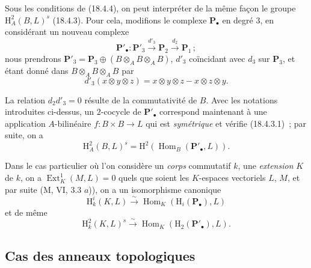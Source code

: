 \begin{env}[18.4.5]
\label{0.18.4.5-fr}
Sous les conditions de (18.4.4), on peut interpréter de la même façon le
groupe $\mathrm H_A^2(B,L)^s$ (18.4.3). Pour cela, modifions le complexe
$\mathbf P_\bullet$ en degré $3$, en considérant un nouveau complexe
\[
  \mathbf P'_\bullet:\mathbf P'_3\xrightarrow{d'_3}\mathbf P_2
  \xrightarrow{d_2}\mathbf P_1\,;
\]
nous prendrons
$\mathbf P'_3=\mathbf P_3\oplus(B\otimes_A B\otimes_A B)$, $d'_3$ coïncidant
avec $d_3$ sur $\mathbf P_3$, et étant donné dans $B\otimes_A B\otimes_A B$
par
\[
  d'_3(x\otimes y\otimes z)=x\otimes y\otimes z-x\otimes z\otimes y.
\]

La relation $d_2d'_3=0$ résulte de la commutativité de $B$. Avec les notations
introduites ci-dessus, un $2$-cocycle de $\mathbf P'_\bullet$ correspond
maintenant à une application $A$-bilinéaire $f:B\times B\to L$ qui est
\emph{symétrique} et vérifie (18.4.3.1)~; par suite, on a
\[
  \mathrm H_A^2(B,L)^s
  =\mathrm H^2(\operatorname{Hom}_B(\mathbf P'_\bullet,L)).
\]
\end{env}

\begin{env}[18.4.6]
\label{0.18.4.6-fr}
Dans le cas particulier où l'on considère un \emph{corps} commutatif $k$, une
\emph{extension} $K$ de $k$, on a $\operatorname{Ext}_K^1(M,L)=0$ quels que
soient les $K$-espaces vectoriels $L$, $M$, et par suite (M, VI, 3.3 $a$)), on
a un isomorphisme canonique
\begin{equation}
\label{0.18.4.6.1-fr}
\tag{18.4.6.1}
  \mathrm H_k^i(K,L)\xrightarrow{\sim}
  \operatorname{Hom}_K(\mathrm H_i(\mathbf P_\bullet),L)
\end{equation}
et de même
\begin{equation}
\label{0.18.4.6.2-fr}
\tag{18.4.6.2}
  \mathrm H_k^2(K,L)^s\xrightarrow{\sim}
  \operatorname{Hom}_K(\mathrm H_2(\mathbf P'_\bullet),L).
\end{equation}
\end{env}

\subsection{Cas des anneaux topologiques}
\label{subsection:0.18.5-fr}

